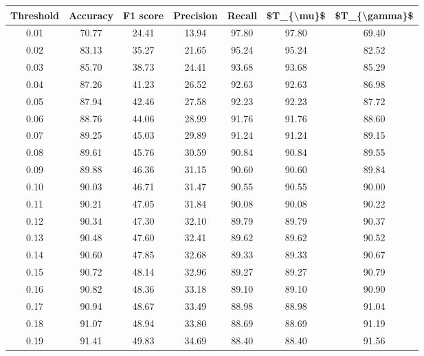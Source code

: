 \begin{tabular}{|c|c|c|c|c|c|c|}
\toprule
 Threshold &  Accuracy &  F1 score &  Precision &  Recall &  \$T\_\{\textbackslash mu\}\$ &  \$T\_\{\textbackslash gamma\}\$ \\
\hline
      0.01 &     70.77 &     24.41 &      13.94 &   97.80 &      97.80 &         69.40 \\
      0.02 &     83.13 &     35.27 &      21.65 &   95.24 &      95.24 &         82.52 \\
      0.03 &     85.70 &     38.73 &      24.41 &   93.68 &      93.68 &         85.29 \\
      0.04 &     87.26 &     41.23 &      26.52 &   92.63 &      92.63 &         86.98 \\
      0.05 &     87.94 &     42.46 &      27.58 &   92.23 &      92.23 &         87.72 \\
      0.06 &     88.76 &     44.06 &      28.99 &   91.76 &      91.76 &         88.60 \\
      0.07 &     89.25 &     45.03 &      29.89 &   91.24 &      91.24 &         89.15 \\
      0.08 &     89.61 &     45.76 &      30.59 &   90.84 &      90.84 &         89.55 \\
      0.09 &     89.88 &     46.36 &      31.15 &   90.60 &      90.60 &         89.84 \\
      0.10 &     90.03 &     46.71 &      31.47 &   90.55 &      90.55 &         90.00 \\
      0.11 &     90.21 &     47.05 &      31.84 &   90.08 &      90.08 &         90.22 \\
      0.12 &     90.34 &     47.30 &      32.10 &   89.79 &      89.79 &         90.37 \\
      0.13 &     90.48 &     47.60 &      32.41 &   89.62 &      89.62 &         90.52 \\
      0.14 &     90.60 &     47.85 &      32.68 &   89.33 &      89.33 &         90.67 \\
      0.15 &     90.72 &     48.14 &      32.96 &   89.27 &      89.27 &         90.79 \\
      0.16 &     90.82 &     48.36 &      33.18 &   89.10 &      89.10 &         90.90 \\
      0.17 &     90.94 &     48.67 &      33.49 &   88.98 &      88.98 &         91.04 \\
      0.18 &     91.07 &     48.94 &      33.80 &   88.69 &      88.69 &         91.19 \\
      0.19 &     91.41 &     49.83 &      34.69 &   88.40 &      88.40 &         91.56 \\

\end{tabular}
